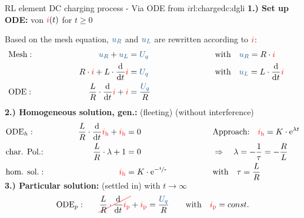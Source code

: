 \begin{frame}[t]
{\begin{expl}{RL element DC charging process - Via ODE from $i$}{rl:chargedc:dgli}
    \textbf{1.) Set up ODE:} von ${\color{red}i}(t)$ for $t \geq 0$\vspace{5pt}

    Based on the mesh equation, $\ecv{u_R}$ and $\ecv{u_L}$ are rewritten according to ${\color{red}i}$:%
    \begingroup%
        \addtolength{\jot}{2pt}%
    \begin{align*}
        &\text{Mesh}:&&&
            \ecv{u_R} + \ecv{u_L}  &= \ecv{U_q}&&&
            &\text{with}\quad \ecv{u_R} = R \cdot \eci{i} \\
        &&&&
            R \cdot \eci{i} + L \cdot \dt \eci{i} &= \ecv{U_q} &&&
            &\text{with}\quad \ecv{u_L} = L \cdot \dt \eci{i} \\
        &\text{ODE}:&&&
        \frac{L}{R} \cdot \dt \eci{i}  + \eci{i}  &= \frac{\ecv{U_q}}{R}
        \\[-15pt]&\hphantom{R1oooooooooo}&&&\hphantom{L3ooooooooooo}&\hphantom{R3ooooooooooooooo}&&&&\hphantom{R5oooooooooooooooooo}\nonumber%
    \end{align*}%
    \textbf{2.) Homogeneous solution, gen.:} (fleeting) (without interference)%
    \begin{align*}%
        &\text{ODE}_{h}:&&&
            \frac{L}{R} \cdot \dt \eci{i_{\mathrm h}} + \eci{i_{\mathrm h}} &= 0 &&&
                &\text{Approach:}\quad
                \eci{i_{\mathrm h}} = K \cdot \mathrm{e}^{\lambda t}\\
        &\text{char. Pol.:}&&&
            \frac{L}{R} \cdot \lambda + 1 &= 0 &&&
                &\Rightarrow\quad \lambda = -\frac{1}{\tau} = -\frac{R}{L}\\
        &\text{hom. sol.}:&&&
            \eci{i_{\mathrm h}} &= K \cdot \mathrm{e}^{-\sfrac{t}{\tau}}&&&
                &\text{with}\quad \tau = \frac{L}{R}
        \\[-15pt]&\hphantom{R1oooooooooo}&&&\hphantom{L3ooooooooooo}&\hphantom{R3ooooooooooooooo}&&&&\hphantom{R5oooooooooooooooooo}\nonumber%
    \end{align*}%
    \textbf{3.) Particular solution:} (settled in) with $t \to \infty$%
    \begin{align*}%
        &\text{ODE}_{p}:&&&
            \redcancel{\frac{L}{R} \cdot \dt \eci{i_{\mathrm p}}} + \eci{i_{\mathrm p}} &= \frac{\ecv{U_q}}{R} &&&
                &\text{with}\quad \eci{i_{\mathrm p}} = const.  \\

\end{align*}
\end{expl}}
\end{frame}
